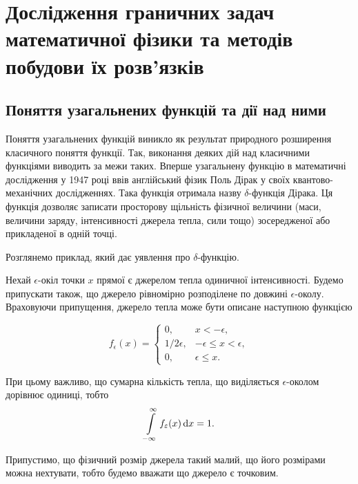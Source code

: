 % 


% 

% 


\setcounter{section}{3}

\section{Дослідження граничних задач математичної фізики та методів побудови їх розв'язків}

\subsection{Поняття узагальнених функцій та дії над ними}

Поняття узагальнених функцій виникло як результат природного розширення класичного поняття функції. Так, виконання деяких дій над класичними функціями виводить за межи таких. Вперше узагальнену функцію в математичні дослідження у 1947 році ввів англійський фізик Поль Дірак у своїх квантово-механічних дослідженнях. Така функція отримала назву $\delta$-функція Дірака. Ця функція дозволяє записати просторову щільність фізичної величини (маси, величини заряду, інтенсивності джерела тепла, сили тощо) зосередженої або прикладеної в одній точці. \medskip

Розглянемо приклад, який дає уявлення про $\delta$-функцію. 
\begin{example}
	Нехай $\epsilon$-окіл точки $x$ прямої є джерелом тепла одиничної інтенсивності. Будемо припускати також, що джерело рівномірно розподілене по довжині $\epsilon$-околу. Враховуючи припущення, джерело тепла може бути описане наступною функцією

	\begin{equation}
		f_\epsilon(x) = \begin{cases} 
			0, & x < - \epsilon, \\
			1 / 2 \epsilon, & - \epsilon \le x < \epsilon, \\
			0, & \epsilon \le x.
		\end{cases}
	\end{equation}
\end{example}

\begin{remark}
	При цьому важливо, що сумарна кількість тепла, що виділяється $\epsilon$-околом дорівнює одиниці, тобто
	\begin{equation}
		\displaystyle\int\limits_{-\infty}^\infty f_\varepsilon(x) \mathop{}\!\mathrm{d} x = 1.
	\end{equation}
\end{remark}
Припустимо, що фізичний розмір джерела такий малий, що його розмірами можна нехтувати, тобто будемо вважати що джерело є точковим. \medskip

